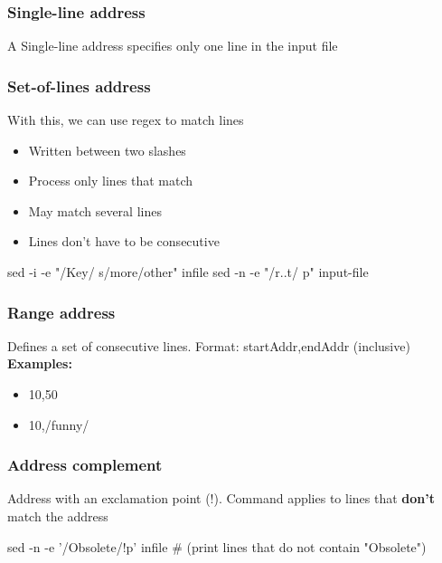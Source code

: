 \documentclass{report}
\begin{document}
    \subsubsection{Single-line address}
    \bigbreak \noindent 
    A Single-line address specifies only one line in the input file
    \bigbreak \noindent
    \bigbreak \noindent 

    \bigbreak \noindent 
    \subsubsection{Set-of-lines address}
    \bigbreak \noindent 
    With this, we can use regex to match lines
    \begin{itemize}
        \item Written between two slashes 
        \item Process only lines that match
        \item May match several lines
        \item Lines don't have to be consecutive
    \end{itemize}
    \bigbreak \noindent 
    \begin{bashcode}
    sed -i -e "/Key/ s/more/other" infile
    sed -n -e "/r..t/ p" input-file
    \end{bashcode}

    \bigbreak \noindent 
    \subsubsection{Range address}
    \bigbreak \noindent 
    Defines a set of consecutive lines. Format: startAddr,endAddr (inclusive)
    \bigbreak \noindent 
    \textbf{Examples:}
    \begin{itemize}
        \item 10,50
        \item 10,/funny/
    \end{itemize}

    \bigbreak \noindent 
    \subsubsection{Address complement}
    \bigbreak \noindent 
    Address with an exclamation point (!). Command applies to lines that \textbf{don't} match the address
    \bigbreak \noindent 
    \begin{bashcode}
    sed -n -e '/Obsolete/!p' infile # (print lines that do not contain "Obsolete")
    \end{bashcode}
    \bigbreak \noindent 
\end{document}
